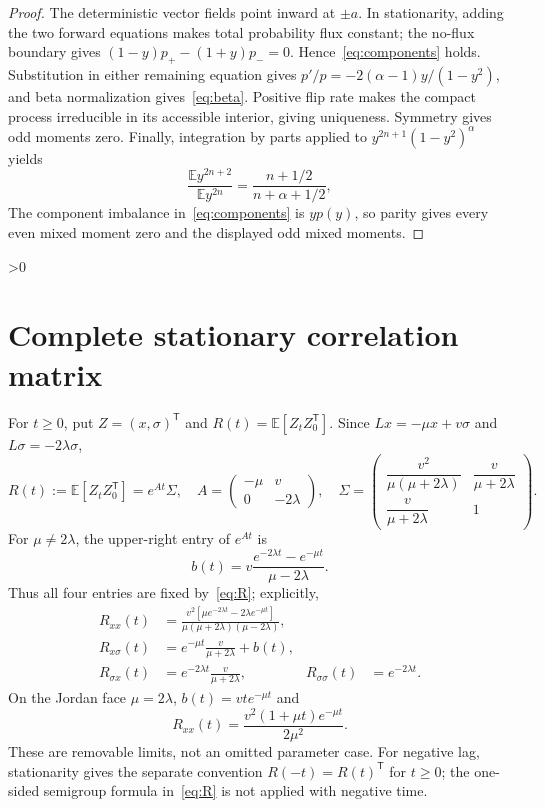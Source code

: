 \documentclass[10pt]{article}
\providecommand{\CRevisionRound}{2}
\newcommand{\EE}{\mathbb E}
\begin{document}
\begin{proof}
The deterministic vector fields point inward at $\pm a$.  In stationarity,
adding the two forward equations makes total probability flux constant;
the no-flux boundary gives
$(1-y)p_+-(1+y)p_-=0$.  Hence~\eqref{eq:components} holds.  Substitution
in either remaining equation gives
$p'/p=-2(\alpha-1)y/(1-y^2)$, and beta normalization gives~\eqref{eq:beta}.
Positive flip rate makes the compact process irreducible in its accessible
interior, giving uniqueness.  Symmetry gives odd moments zero.  Finally,
integration by parts applied to
$y^{2n+1}(1-y^2)^\alpha$ yields
\[
 \frac{\EE y^{2n+2}}{\EE y^{2n}}
 =\frac{n+1/2}{n+\alpha+1/2},
\]
The component imbalance in~\eqref{eq:components} is $yp(y)$, so parity
gives every even mixed moment zero and the displayed odd mixed moments.
\end{proof}

\ifnum\CRevisionRound>0
\section{Complete stationary correlation matrix}
For $t\geq0$, put $Z=(x,\sigma)^{\mathsf T}$ and
$R(t)=\EE[Z_tZ_0^{\mathsf T}]$.  Since $Lx=-\mu x+v\sigma$ and
$L\sigma=-2\lambda\sigma$,
\begin{equation}\label{eq:R}
 R(t):=\EE[Z_tZ_0^{\mathsf T}]=e^{At}\Sigma,\quad
 A=\begin{pmatrix}-\mu&v\\0&-2\lambda\end{pmatrix},\quad
 \Sigma=\begin{pmatrix}
 \dfrac{v^2}{\mu(\mu+2\lambda)}&\dfrac v{\mu+2\lambda}\\[3pt]
 \dfrac v{\mu+2\lambda}&1
 \end{pmatrix}.
\end{equation}
For $\mu\ne2\lambda$, the upper-right entry of $e^{At}$ is
\[
 b(t)=v\frac{e^{-2\lambda t}-e^{-\mu t}}{\mu-2\lambda}.
\]
Thus all four entries are fixed by~\eqref{eq:R}; explicitly,
\begin{align}
 R_{xx}(t)&=\frac{v^2[\mu e^{-2\lambda t}
       -2\lambda e^{-\mu t}]}
 {\mu(\mu+2\lambda)(\mu-2\lambda)},\label{eq:cxx}\\
 R_{x\sigma}(t)&=e^{-\mu t}\frac v{\mu+2\lambda}+b(t),\nonumber\\
 R_{\sigma x}(t)&=e^{-2\lambda t}\frac v{\mu+2\lambda},&
 R_{\sigma\sigma}(t)&=e^{-2\lambda t}.
\end{align}
On the Jordan face $\mu=2\lambda$, $b(t)=vt e^{-\mu t}$ and
\begin{equation}\label{eq:jordan-corr}
 R_{xx}(t)=\frac{v^2(1+\mu t)e^{-\mu t}}{2\mu^2}.
\end{equation}
These are removable limits, not an omitted parameter case.
For negative lag, stationarity gives the separate convention
$R(-t)=R(t)^{\mathsf T}$ for $t\geq0$; the one-sided semigroup formula
in~\eqref{eq:R} is not applied with negative time.
\end{document}
